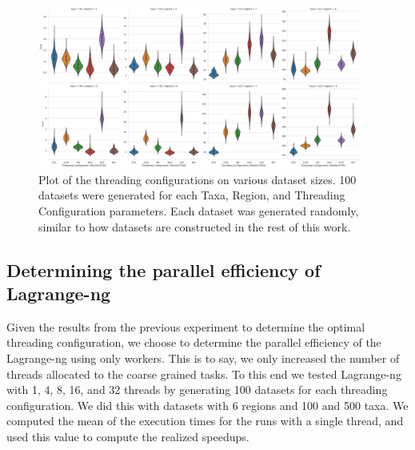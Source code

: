 \documentclass{article}
\begin{document}
\begin{figure}
  \begin{center}
    \includegraphics[width=0.95\textwidth]{figures/threading_violin.png}
  \end{center}
  \caption{Plot of the threading configurations on various dataset sizes. 100 datasets were generated for each Taxa,
    Region, and Threading Configuration parameters. Each dataset was generated randomly, similar to how datasets are
    constructed in the rest of this work.}
  \label{fig:threading-configurations}
\end{figure}

\subsection{Determining the parallel efficiency of Lagrange-ng}

Given the results from the previous experiment to determine the optimal threading configuration, we choose to determine
the parallel efficiency of the Lagrange-ng using only workers. This is to say, we only increased the number of threads
allocated to the coarse grained tasks. To this end we tested Lagrange-ng with 1, 4, 8, 16, and 32 threads by generating
100 datasets for each threading configuration. We did this with datasets with 6 regions and 100 and 500 taxa. We
computed the mean of the execution times for the runs with a single thread, and used this value to compute the
realized speedups.
\end{document}
